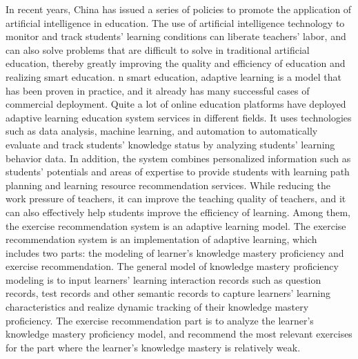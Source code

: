 

In recent years, China has issued a series of policies to promote the application of artificial intelligence in education. The use of artificial intelligence technology to monitor and track students' learning conditions can liberate teachers' labor, and can also solve problems that are difficult to solve in traditional artificial education, thereby greatly improving the quality and efficiency of education and realizing smart education. n smart education, adaptive learning is a model that has been proven in practice, and it already has many successful cases of commercial deployment. Quite a lot of online education platforms have deployed adaptive learning education system services in different fields. It uses technologies such as data analysis, machine learning, and automation to automatically evaluate and track students' knowledge status by analyzing students' learning behavior data. In addition, the system combines personalized information such as students' potentials and areas of expertise to provide students with learning path planning and learning resource recommendation services. While reducing the work pressure of teachers, it can improve the teaching quality of teachers, and it can also effectively help students improve the efficiency of learning. Among them, the exercise recommendation system is an adaptive learning model. The exercise recommendation system is an implementation of adaptive learning, which includes two parts: the modeling of learner's knowledge mastery proficiency and exercise recommendation. The general model of knowledge mastery proficiency modeling is to input learners' learning interaction records such as question records, test records and other semantic records to capture learners' learning characteristics and realize dynamic tracking of their knowledge mastery proficiency. The exercise recommendation part is to analyze the learner's knowledge mastery proficiency model, and recommend the most relevant exercises for the part where the learner's knowledge mastery is relatively weak.

